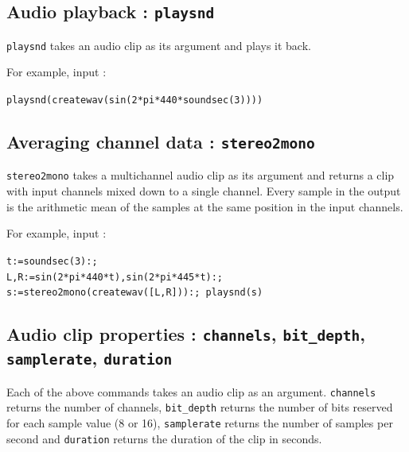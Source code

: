 \documentclass[a4paper,11pt]{book}
\begin{document}
\subsection{Audio playback : {\tt playsnd}}
{\tt playsnd} takes an audio clip as its argument and plays it back.

For example, input :
\begin{center}
  {\tt playsnd(createwav(sin(2*pi*440*soundsec(3))))}
\end{center}

\subsection{Averaging channel data : {\tt stereo2mono}}
{\tt stereo2mono} takes a multichannel audio clip as its argument and returns a clip with input channels mixed down to a single channel. Every sample in the output is the arithmetic mean of the samples at the same position in the input channels.

For example, input :
\begin{center}
  {\tt t:=soundsec(3):;\\L,R:=sin(2*pi*440*t),sin(2*pi*445*t):;\\s:=stereo2mono(createwav([L,R])):; playsnd(s)}
\end{center}

\subsection{Audio clip properties : {\tt channels}, {\tt bit\_depth}, {\tt samplerate}, {\tt duration}}
Each of the above commands takes an audio clip as an argument. {\tt channels} returns the number of channels, {\tt bit\_depth} returns the number of bits reserved for each sample value (8 or 16), {\tt samplerate} returns the number of samples per second and {\tt duration} returns the duration of the clip in seconds.
\end{document}
